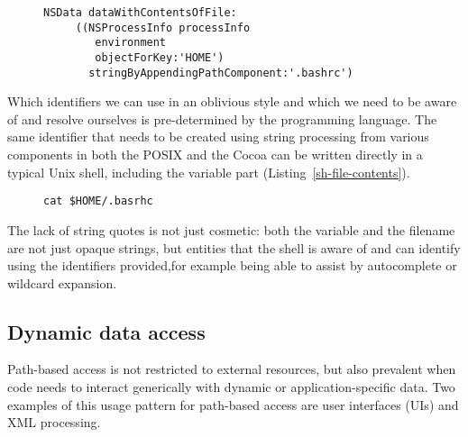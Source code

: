 \documentclass[preprint,authoryear]{acm_proc_article-sp}
\begin{document}
\begin{figure}[htbp]
\begin{lstlisting}[style=L,label=cocoa-file-contents,caption=Cocoa convenience API for accessing file contents.]
   NSData dataWithContentsOfFile:
     ((NSProcessInfo processInfo
        environment 
        objectForKey:'HOME') 
       stringByAppendingPathComponent:'.bashrc')
\end{lstlisting}
\end{figure}

Which identifiers we can use in an oblivious style and which we need to
be aware of and resolve ourselves is pre-determined by the programming
language.
The same identifier that needs to be created using string processing from various
components in both the POSIX and the Cocoa can be written directly in a typical
Unix shell, including the variable part (Listing~\ref{sh-file-contents}).


\begin{figure}[htbp]
\begin{lstlisting}[style=L,label=sh-file-contents,caption=File contents in a shell.]
  cat $HOME/.basrhc
\end{lstlisting}
\end{figure}

The lack of string quotes is not just cosmetic: both the variable and the filename
are not just opaque strings, but entities that the shell is aware of and can identify
using the identifiers provided,for example being able to assist by autocomplete 
or wildcard expansion.


\subsection{Dynamic data access}

Path-based access is not restricted to external resources, but also
prevalent when code needs to interact generically with dynamic
or application-specific data.   Two examples of this usage pattern
 for path-based access are user interfaces (UIs) and XML processing.
\end{document}
